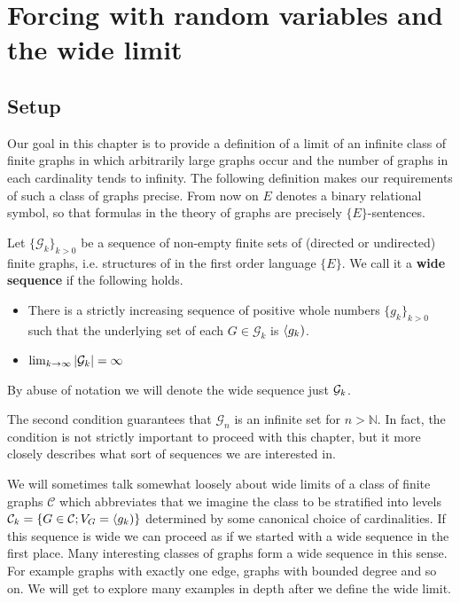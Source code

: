 \chapter{Forcing with random variables and the wide limit}\label{chapwidelimit}
\section{Setup}

Our goal in this chapter is to provide a definition of a limit of an infinite class of finite graphs in which arbitrarily large graphs occur and the number of graphs in each cardinality tends to infinity. The following definition makes our requirements of such a class of graphs precise. From now on $E$ denotes a binary relational symbol, so that formulas in the theory of graphs are precisely $\{E\}$-sentences.

\begin{defi}
Let $\{\mathcal{G}_k\}_{k>0}$ be a sequence of non-empty finite sets of (directed or undirected) finite graphs, i.e. structures of in the first order language $\{E\}$. We call it a \textbf{wide sequence} if the following holds.

\begin{itemize}
\item There is a strictly increasing sequence of positive whole numbers $\{g_k\}_{k>0}$ such that the underlying set of each $G\in\mathcal{G}_k$ is $\langle g_k)$.
\item $\lim_{k\to\infty} \left|{\mathcal{G}_k}\right|=\infty$
\end{itemize}

By abuse of notation we will denote the wide sequence just $\mathcal{G}_k$.
\end{defi}

The second condition guarantees that $\mathcal{G}_n$ is an infinite set for $n>\mathbb{N}$. In fact, the condition is not strictly important to proceed with this chapter, but it more closely describes what sort of sequences we are interested in. 

We will sometimes talk somewhat loosely about wide limits of a class of finite graphs $\mathcal{C}$ which abbreviates that we imagine the class to be stratified into levels $\mathcal{C}_k=\{G\in\mathcal{C}; V_G=\langle g_k)\}$ determined by some canonical choice of cardinalities. If this sequence is wide we can proceed as if we started with a wide sequence in the first place. Many interesting classes of graphs form a wide sequence in this sense. For example graphs with exactly one edge, graphs with bounded degree and so on. We will get to explore many examples in depth after we define the wide limit. 

